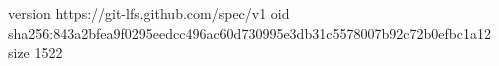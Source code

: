 version https://git-lfs.github.com/spec/v1
oid sha256:843a2bfea9f0295eedcc496ac60d730995e3db31c5578007b92c72b0efbc1a12
size 1522
